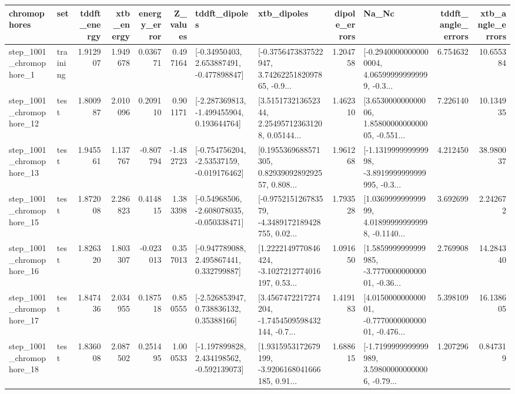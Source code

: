 \begin{tabular}{llrrrrllrlrr}
\toprule
             chromophores &       set &  tddft\_energy &  xtb\_energy &  energy\_error &  Z\_values &                               tddft\_dipoles &                                        xtb\_dipoles &  dipole\_errors &                                              Na\_Nc &  tddft\_angle\_errors &  xtb\_angle\_errors \\
\midrule
  step\_1001\_chromophore\_1 &  training &      1.912907 &    1.949678 &      0.036771 &  0.497164 &    [-0.34950403, 2.653887491, -0.477898847] &  [-0.3756473837522947, 3.7426225182097865, -0.9... &       1.204758 &  [-0.29400000000000004, 4.065999999999999, -0.3... &            6.754632 &         10.655384 \\
 step\_1001\_chromophore\_12 &      test &      1.800987 &    2.010096 &      0.209110 &  0.901171 &   [-2.287369813, -1.499455904, 0.193644764] &  [3.515173213652344, 2.254957123631208, 0.05144... &       1.462310 &  [3.653000000000006, 1.8580000000000005, -0.551... &            7.226140 &         10.134935 \\
 step\_1001\_chromophore\_13 &      test &      1.945561 &    1.137767 &     -0.807794 & -1.482723 &   [-0.754756204, -2.53537159, -0.019176462] &  [0.1955369688571305, 0.8293909289292557, 0.808... &       1.961268 &  [-1.131999999999998, -3.8919999999999995, -0.3... &            4.212450 &         38.980037 \\
 step\_1001\_chromophore\_15 &      test &      1.872008 &    2.286823 &      0.414815 &  1.383398 &   [-0.54968506, -2.608078035, -0.050338471] &  [-0.975215126783579, -4.3489172189428755, 0.02... &       1.793528 &  [1.036999999999999, 4.018999999999998, -0.1140... &            3.692699 &          2.242672 \\
 step\_1001\_chromophore\_16 &      test &      1.826320 &    1.803307 &     -0.023013 &  0.357013 &    [-0.947789088, 2.495867441, 0.332799887] &  [1.2222149770846424, -3.1027212774016197, 0.53... &       1.091650 &  [1.5859999999999985, -3.777000000000001, -0.36... &            2.769908 &         14.284340 \\
 step\_1001\_chromophore\_17 &      test &      1.847436 &    2.034955 &      0.187518 &  0.850555 &     [-2.526853947, 0.738836132, 0.35388166] &  [3.4567472217274204, -1.7454509598432144, -0.7... &       1.419183 &  [4.015000000000001, -0.777000000000001, -0.476... &            5.398109 &         16.138605 \\
 step\_1001\_chromophore\_18 &      test &      1.836008 &    2.087502 &      0.251495 &  1.000533 &   [-1.197899828, 2.434198562, -0.592139073] &  [1.9315953172679199, -3.9206168041666185, 0.91... &       1.688615 &  [-1.7199999999999989, 3.598000000000006, -0.79... &            1.207296 &          0.847319 \\

\end{tabular}

